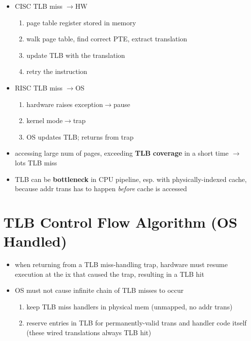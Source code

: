 \begin{minipage}{.34\linewidth}
  \flushleft
  \begin{itemize}
  \item CISC TLB miss $\to$HW
    \begin{enumerate}
    \item page table register stored in memory
    \item walk page table, find correct PTE, extract translation
    \item update TLB with the translation
    \item retry the instruction
    \end{enumerate}
  \item RISC TLB miss $\to$OS
    \begin{enumerate}
    \item hardware raises exception$\to$pause
    \item kernel mode$\to$trap
    \item OS updates TLB; returns from trap
    \end{enumerate}
  \item accessing large num of pages, exceeding \textbf{TLB} \textbf{coverage} in a short time $\to$ lots TLB miss
  \item TLB can be \textbf{bottleneck} in CPU pipeline, esp. with physically-indexed cache, because addr trans has to happen \emph{before} cache is accessed

  \end{itemize}
\end{minipage}
\section*{TLB Control Flow Algorithm (OS Handled)}
\begin{itemize}
\item when returning from a TLB miss-handling trap, hardware must resume execution at the ix that caused the trap, resulting in a TLB hit
\item OS must not cause infinite chain of TLB misses to occur
  \begin{enumerate}
  \item keep TLB miss handlers in physical mem (unmapped, no addr trans)
  \item reserve entries in TLB for permanently-valid trans and handler code itself (these wired translations always TLB hit)
  \end{enumerate}
\end{itemize}
